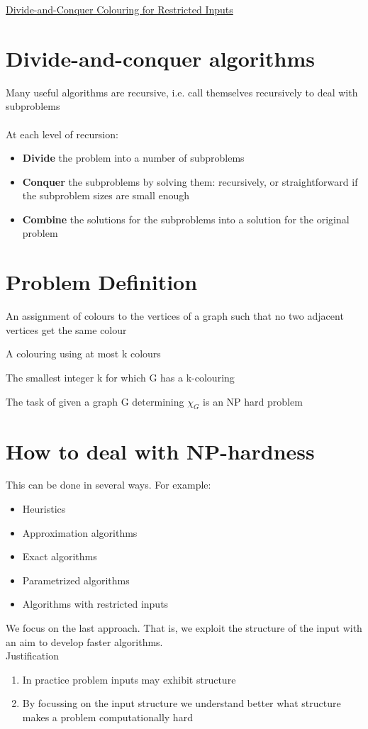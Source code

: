 \documentclass{article}[18pt]
\begin{document}
\begin{center}
\underline{\huge Divide-and-Conquer Colouring for Restricted Inputs}
\end{center}
\section{Divide-and-conquer algorithms}
Many useful algorithms are recursive, i.e. call themselves recursively to deal with subproblems\\
\\
At each level of recursion:
\begin{itemize}
	\item \textbf{Divide} the problem into a number of subproblems
	\item \textbf{Conquer} the subproblems by solving them: recursively, or straightforward if the subproblem sizes are small enough
	\item \textbf{Combine} the solutions for the subproblems into a solution for the original problem 
\end{itemize}
\section{Problem Definition}
\begin{defin}[Colouring]
An assignment of colours to the vertices of a graph such that no two adjacent vertices get the same colour
\end{defin}

\begin{defin}[k-colouring]
	A colouring using at most k colours
\end{defin}
\begin{defin}
	The smallest integer k for which G has a k-colouring
\end{defin}
The task of given a graph G determining $\chi_G$ is an NP hard problem
\section{How to deal with NP-hardness}
This can be done in several ways. For example:
\begin{itemize}
	\item Heuristics
	\item Approximation algorithms
	\item Exact algorithms
	\item Parametrized algorithms
	\item Algorithms with restricted inputs
\end{itemize}
We focus on the last approach. That is, we exploit the structure of the input with an aim to develop faster algorithms.\\
Justification
\begin{enumerate}
	\item In practice problem inputs may exhibit structure
	\item By focussing on the input structure we understand better what structure makes a problem computationally hard
\end{enumerate}
\end{document}
